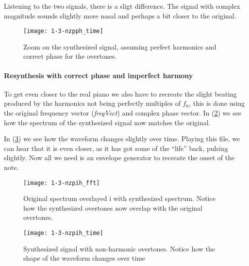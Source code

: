 Listening to the two signals, there is a sligt difference.
The signal with complex magnitude sounds slightly more nasal and perhaps a bit
closer to the original.

\begin{figure}
	\center
	\texttt{[image: 1-3-nzpph\_time]}
	\caption{ Zoom on the synthesized signal, assuming
 perfect harmonics and correct phase for the overtones. }
	\label{fig:1-3-nzpph_time}
\end{figure}

\paragraph{ Resynthesis with correct phase and imperfect harmony }
To get even closer to the real piano we also have to recreate the slight beating
produced by the harmonics not being perfectly multiples of $f_0$,
this is done using the original frequency vector (\emph{freqVect}) and complex
phase vector. In (\ref{fig:1-3-nzpih_fft}) we see how the spectrum of the
synthesized signal now matches the original.

In (\ref{fig:1-3-nzpih_time}) we see how the waveform changes slightly over
time.
Playing this file, we can hear that it is even closer, as it has got some of the
``life'' back, pulsing slightly. Now all we need is an envelope generator to
recreate the onset of the note.

\begin{figure}
	\center
	\texttt{[image: 1-3-nzpih\_fft]}
	\caption{ Original spectrum overlayed i with synthesized
spectrum. Notice how the synthesized overtones now overlap with the original
overtones. }
	\label{fig:1-3-nzpih_fft}
\end{figure}

\begin{figure}
	\center
	\texttt{[image: 1-3-nzpih\_time]}
	\caption{ Synthesized signal with
non-harmonic overtones. Notice how the shape of the
waveform changes over time }
	\label{fig:1-3-nzpih_time}
\end{figure}
